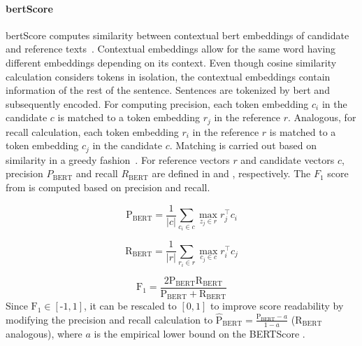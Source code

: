 \paragraph{\acs{bert}Score}
\acs{bert}Score computes similarity between contextual \ac{bert} embeddings of candidate and reference texts~\citep{hanna_fine_grained_2021}. 
Contextual embeddings allow for the same word having different embeddings depending on its context.
Even though cosine similarity calculation considers tokens in isolation, the contextual embeddings contain information of the rest of the sentence.
Sentences are tokenized by \ac{bert} and subsequently encoded.
For computing precision, each token embedding $c_i$ in the candidate $c$ is matched to a token embedding $r_j$ in the reference $r$.
Analogous, for recall calculation, each token embedding $r_i$ in the reference $r$ is matched to a token embedding $c_j$ in the candidate $c$.
Matching is carried out based on similarity in a greedy fashion~\citep{zhang_bertscore_2020}.
For reference vectors $r$ and candidate vectors $c$, precision $P_{\text{BERT}}$ and recall $R_{\text{BERT}}$ are defined in  and , respectively.
The $F_1$ score from  is computed based on precision and recall.

\begin{equation}
    \operatorname{P_{BERT}} = \frac{1}{|c|} \sum_{c_i \in c} \max_{z_j \in r} r_j^\top c_i
\label{eq:bert_p}
\end{equation}

\begin{equation}
    \operatorname{R_{BERT}} = \frac{1}{|r|} \sum_{r_i \in r} \max_{c_j \in c} r_i^\top c_j
\label{eq:bert_r}
\end{equation}

\begin{equation}
    \operatorname{F_1} = \frac{2  \operatorname{P_{BERT}}  \operatorname{R_{BERT}}}{\operatorname{P_{BERT}} + \operatorname{R_{BERT}}} 
\label{eq:bert_f1}
\end{equation}
Since $\operatorname{F_1} \in \left[\text{-}1,1\right]$, it can be rescaled to $[0,1]$ to improve score readability by modifying the precision and recall calculation 
to $\mathrm{\hat{P}_{BERT}} = \frac{\operatorname{P_{BERT}} - a}{1 - a}$ ($\operatorname{R_{BERT}}$ analogous), where $a$ is the empirical lower bound on the BERTScore \citep{zhang_bertscore_2020,hanna_fine_grained_2021}.


